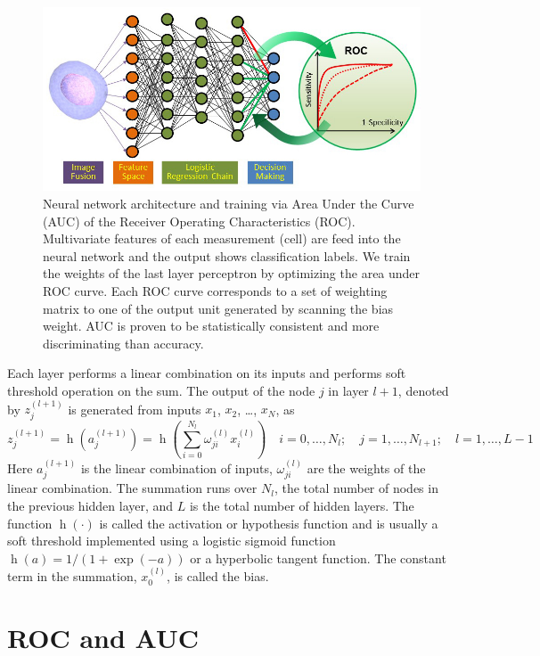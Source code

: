 \documentclass[aps,pra,reprint,superscriptaddress]{revtex4-1}
\DeclareMathOperator{\h}{h} %
\begin{document}
\begin{figure}
\includegraphics[scale=0.55]{FigureNeuralNet.jpg}
\caption{\label{fig:NeuralNet} Neural network architecture and training via Area Under the Curve (AUC) of the Receiver Operating Characteristics (ROC). Multivariate features of each measurement (cell) are feed into the neural network and the output shows classification labels. We train the weights of the last layer perceptron by optimizing the area under ROC curve. Each ROC curve corresponds to a set of weighting matrix to one of the output unit generated by scanning the bias weight. AUC is proven to be statistically consistent and more discriminating than accuracy.}
\end{figure}


Each layer performs a linear combination on its inputs and performs soft threshold operation on the sum. The output of the node $j$ in layer $l+1$, denoted by $z_j^{(l+1)}$ is generated from inputs $x_1$, $x_2$, \ldots, $x_N$, as
\begin{equation}
z_j^{(l+1)} = \h(a_j^{(l+1)}) = \h(\sum_{i=0}^{N_l} \omega_{ji}^{(l)} x_i^{(l)})\quad i =0,\dotsc,N_l;\quad j=1,\dotsc,N_{l+1};\quad l=1,\dotsc,L-1
\end{equation}
Here $a_j^{(l+1)}$ is the linear combination of inputs, $\omega_{ji}^{(l)}$ are the weights of the linear combination. The summation runs over $N_l$, the total number of nodes in the previous hidden layer, and $L$ is the total number of hidden layers. The function $\h(\cdot)$ is called the activation or hypothesis function and is usually a soft threshold implemented using a logistic sigmoid function $\h(a)=1/(1+\exp⁡(-a))$ or a hyperbolic tangent function. The constant term in the summation, $x_0^{(l)}$, is called the bias.

\section{ROC and AUC}
\end{document}

